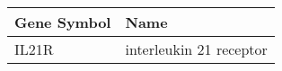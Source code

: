 \begin{tabular}{ll}
\toprule
Gene Symbol &                    Name \\
\midrule
      IL21R & interleukin 21 receptor \\
\bottomrule
\end{tabular}
